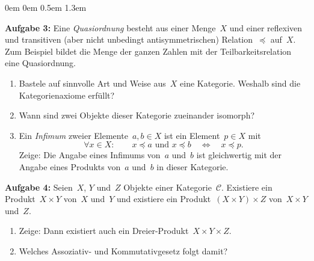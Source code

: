 \documentclass[a4paper,ngerman]{scrartcl}
\theoremstyle{definition}
\theoremstyle{plain}
\theoremstyle{remark}
\newcommand{\C}{\mathcal{C}}
\begin{document}
\begin{list}{}{0em \leftmargin0em \itemindent0.5em \itemsep 1.3em}
\item[\textbf{Aufgabe 3:}]
Eine \emph{Quasiordnung} besteht aus einer Menge~$X$ und einer reflexiven und
transitiven (aber nicht unbedingt antisymmetrischen) Relation~$\preceq$
auf~$X$. Zum Beispiel bildet die Menge der ganzen Zahlen mit der
Teilbarkeitsrelation eine Quasiordnung.
\begin{enumerate}
\item Bastele auf sinnvolle Art und Weise aus~$X$ eine Kategorie. Weshalb sind
die Ka\-te\-go\-rien\-axi\-ome erfüllt?
\item Wann sind zwei Objekte dieser Kategorie zueinander isomorph?
\item Ein \emph{Infimum} zweier Elemente~$a,b\in X$ ist ein Element~$p \in X$
mit
\[ \forall x \in X{:}\qquad x \preceq a \text{ und } x \preceq b \quad\Longleftrightarrow\quad x \preceq p.
\]
Zeige: Die Angabe eines Infimums von~$a$ und~$b$ ist gleichwertig mit der
Angabe eines Produkts von~$a$ und~$b$ in dieser Kategorie.
\end{enumerate}

\item[\textbf{Aufgabe 4:}] Seien~$X$, $Y$ und~$Z$ Objekte einer Kategorie~$\C$.
Existiere ein Produkt~$X \times Y$ von~$X$ und~$Y$ und existiere ein
Produkt~$(X \times Y) \times Z$ von~$X \times Y$ und~$Z$.
\begin{enumerate}
\item Zeige: Dann existiert auch ein Dreier-Produkt~$X \times Y \times Z$.
\item Welches Assoziativ- und Kommutativgesetz folgt damit?
\end{enumerate}
\end{list}
\end{document}
